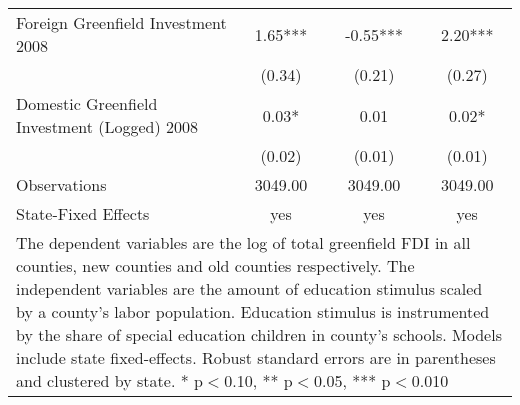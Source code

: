 \begin{table}[!htbp]
\begin{tabular}{l*{3}{c}}
Foreign Greenfield Investment 2008&        1.65***&       -0.55***&        2.20***\\
                    &      (0.34)   &      (0.21)   &      (0.27)   \\
Domestic Greenfield Investment (Logged) 2008&        0.03*  &        0.01   &        0.02*  \\
                    &      (0.02)   &      (0.01)   &      (0.01)   \\
\hline
Observations        &     3049.00   &     3049.00   &     3049.00   \\
State-Fixed Effects &         yes   &         yes   &         yes   \\
\hline\hline
\multicolumn{4}{p{\linewidth}}{\footnotesize The dependent variables are the log of total greenfield FDI in all counties, new counties and old counties respectively. The independent variables are the amount of education stimulus scaled by a county's labor population. Education stimulus is instrumented by the share of special education children in county's schools. Models include state fixed-effects. Robust standard errors are in parentheses and clustered by state. * p$<$0.10, ** p$<$0.05, *** p$<$0.010}\\
\end{tabular}
\end{table}
